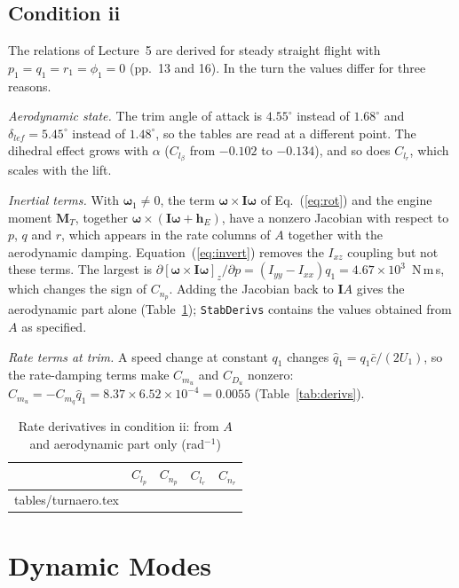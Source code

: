 \documentclass[conf]{new-aiaa}
\makeatletter
\newcommand\tabinput[1]{\@@input #1 }
\makeatother
\begin{document}
\subsection{Condition ii}
The relations of Lecture~5 are derived for steady straight flight with $p_1=q_1=r_1=\phi_1=0$ (pp.~13 and 16). In the turn the values differ for three reasons.

\emph{Aerodynamic state.} The trim angle of attack is $4.55^\circ$ instead of $1.68^\circ$ and $\delta_{lef}=5.45^\circ$ instead of $1.48^\circ$, so the tables are read at a different point. The dihedral effect grows with $\alpha$ ($C_{l_\beta}$ from $-0.102$ to $-0.134$), and so does $C_{l_r}$, which scales with the lift.

\emph{Inertial terms.} With $\boldsymbol\omega_1\neq0$, the term $\boldsymbol\omega\times\mathbf I\boldsymbol\omega$ of Eq.~(\ref{eq:rot}) and the engine moment $\mathbf M_T$, together $\boldsymbol\omega\times(\mathbf I\boldsymbol\omega+\mathbf h_E)$, have a nonzero Jacobian with respect to $p$, $q$ and $r$, which appears in the rate columns of $A$ together with the aerodynamic damping. Equation~(\ref{eq:invert}) removes the $I_{xz}$ coupling but not these terms. The largest is $\partial[\boldsymbol\omega\times\mathbf I\boldsymbol\omega]_z/\partial p=(I_{yy}-I_{xx})q_1=4.67\times10^{3}$~N\,m\,s, which changes the sign of $C_{n_p}$. Adding the Jacobian back to $\mathbf I A$ gives the aerodynamic part alone (Table~\ref{tab:turnaero}); \texttt{StabDerivs} contains the values obtained from $A$ as specified.

\emph{Rate terms at trim.} A speed change at constant $q_1$ changes $\hat q_1=q_1\bar c/(2U_1)$, so the rate-damping terms make $C_{m_u}$ and $C_{D_u}$ nonzero: $C_{m_u}=-C_{m_q}\hat q_1=8.37\times6.52\times10^{-4}=0.0055$ (Table~\ref{tab:derivs}).

\begin{table}[hbt!]
\caption{\label{tab:turnaero} Rate derivatives in condition ii: from $A$ and aerodynamic part only (rad$^{-1}$)}
\centering
\begin{tabular}{lcccc}
\toprule
 & $C_{l_p}$ & $C_{n_p}$ & $C_{l_r}$ & $C_{n_r}$ \\
\midrule
\tabinput{tables/turnaero.tex}
\bottomrule
\end{tabular}
\end{table}

\section{Dynamic Modes}
\end{document}
